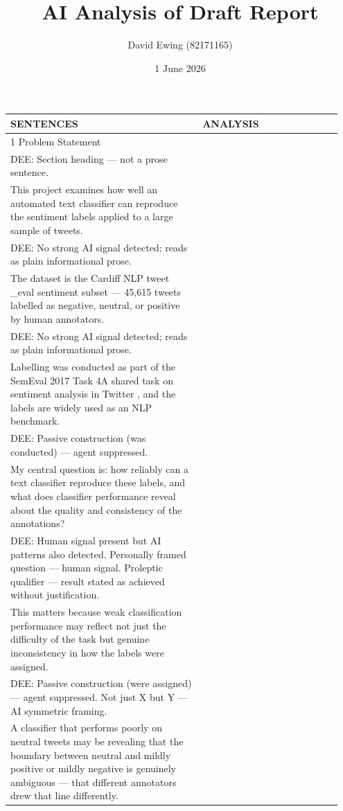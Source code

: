 \documentclass[11pt]{article}
\title{AI Analysis of Draft Report}
\author{David Ewing (82171165)}
\date{1 June 2026}
\begin{document}
\maketitle
\thispagestyle{empty}
\newpage

\setlength{\LTleft}{0pt}
\setlength{\LTright}{0pt}
\begin{longtable}{|p{0.55\linewidth}|p{0.40\linewidth}|}
\hline
\centering\textbf{SENTENCES} & \centering\textbf{ANALYSIS} \tabularnewline[2pt]
\hline
\endhead
1 Problem Statement & \\[2pt]
\hline
DEE: Section heading --- not a prose sentence. & \\
\hline
This project examines how well an automated text classifier can reproduce the sentiment labels applied to a large sample of tweets. & \\[2pt]
\hline
DEE: No strong AI signal detected; reads as plain informational prose. & \\
\hline
The dataset is the Cardiff NLP tweet \_eval sentiment subset --- 45,615 tweets labelled as negative, neutral, or positive by human annotators. & \\[2pt]
\hline
DEE: No strong AI signal detected; reads as plain informational prose. & \\
\hline
Labelling was conducted as part of the SemEval 2017 Task 4A shared task on sentiment analysis in Twitter , and the labels are widely used as an NLP benchmark. & \\[2pt]
\hline
DEE: Passive construction (was conducted) --- agent suppressed. & \\
\hline
My central question is: how reliably can a text classifier reproduce these labels, and what does classifier performance reveal about the quality and consistency of the annotations? & \\[2pt]
\hline
DEE: Human signal present but AI patterns also detected. Personally framed question --- human signal. Proleptic qualifier --- result stated as achieved without justification. & \\
\hline
This matters because weak classification performance may reflect not just the difficulty of the task but genuine inconsistency in how the labels were assigned. & \\[2pt]
\hline
DEE: Passive construction (were assigned) --- agent suppressed. Not just X but Y --- AI symmetric framing. & \\
\hline
A classifier that performs poorly on neutral tweets may be revealing that the boundary between neutral and mildly positive or mildly negative is genuinely ambiguous --- that different annotators drew that line differently. & \\[2pt]

\end{longtable}
\end{document}
